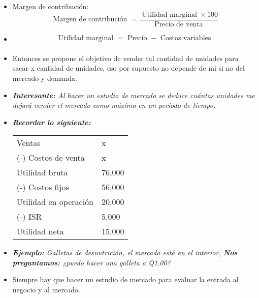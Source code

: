 \begin{itemize}
    \item Margen de contribución: \[
      \text{  Margen de contribución  } = \frac{\text{  Utilidad marginal } \times 100 }{\text{  Precio de venta  } } 
    \]
    \item 
        \begin{align*}
            \text{  Utilidad marginal  } = \text{  Precio  } - \text{  Costos variables  } \\ 
        \end{align*}
    \item Entonces se propone el objetivo de vender tal cantidad de unidades para sacar x cantidad de unidades, eso por supuesto no depende de mi si no del mercado y demanda.
    \item \emph{\textbf{Interesante:} Al hacer un estudio de mercado se deduce cuántas unidades me dejará vender el mercado como máximo en un periodo de tiempo.}
    \item \emph{\textbf{Recordar lo siguiente: }}
        \begin{center}
           \begin{tabular}{ | p{5cm} | p{5cm} | }
               \hline
                    Ventas & x    \\
                    (-) Costos de venta & x \\ 
               \hline
                    Utilidad bruta & 76,000 \\ 
                    (-) Costos fijos & 56,000 \\ 
                \hline
                    Utilidad en operación & 20,000 \\ 
                    (-) ISR & 5,000 \\ 
                    Utilidad neta & 15,000 \\ 
                \hline
           \end{tabular}
        \end{center}
    
    \item \emph{\textbf{Ejemplo: }Galletas de desnutrición, el mercado está en el interior, \textbf{Nos preguntamos:} ¿puedo hacer una galleta a Q1.00?}
    \item Siempre hay que hacer un estudio de mercado para evaluar la entrada al negocio y al mercado.
\end{itemize}


